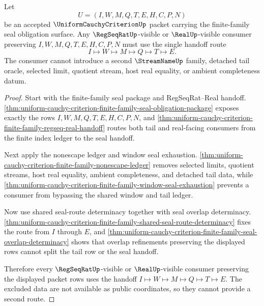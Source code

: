 \begin{theorem}
\label{thm:uniform-cauchy-criterion-finite-family-route-lock}
Let
$$
U=(I,W,M,Q,T,E,H,C,P,N)
$$
be an accepted $\UniformCauchyCriterionUp$ packet carrying the finite-family
seal obligation surface. Any $\RegSeqRatUp$-visible or $\RealUp$-visible
consumer preserving $I,W,M,Q,T,E,H,C,P,N$ must use the single handoff route
$$
I \longmapsto W \longmapsto M \longmapsto Q \longmapsto T \longmapsto E.
$$
The consumer cannot introduce a second $\StreamNameUp$ family, detached tail
oracle, selected limit, quotient stream, host real equality, or ambient
completeness datum.
\end{theorem}
\begin{proof}
Start with the finite-family seal package and RegSeqRat--Real handoff.
\autoref{thm:uniform-cauchy-criterion-finite-family-seal-obligation-package}
exposes exactly the rows $I,W,M,Q,T,E,H,C,P,N$, and
\autoref{thm:uniform-cauchy-criterion-finite-family-regseq-real-handoff}
routes both tail and real-facing consumers from the finite index ledger to the
seal handoff.

Next apply the nonescape ledger and window seal exhaustion.
\autoref{thm:uniform-cauchy-criterion-finite-family-nonescape-ledger} removes
selected limits, quotient streams, host real equality, ambient completeness, and
detached tail data, while
\autoref{thm:uniform-cauchy-criterion-finite-family-window-seal-exhaustion}
prevents a consumer from bypassing the shared window and tail ledger.

Now use shared seal-route determinacy together with seal overlap determinacy.
\autoref{thm:uniform-cauchy-criterion-finite-family-shared-seal-route-determinacy}
fixes the route from $I$ through $E$, and
\autoref{thm:uniform-cauchy-criterion-finite-family-seal-overlap-determinacy}
shows that overlap refinements preserving the displayed rows cannot split the
tail row or the seal handoff.

Therefore every $\RegSeqRatUp$-visible or $\RealUp$-visible consumer preserving
the displayed packet rows uses the handoff
$I \longmapsto W \longmapsto M \longmapsto Q \longmapsto T \longmapsto E$.
The excluded data are not available as public coordinates, so they cannot
provide a second route.
\end{proof}


